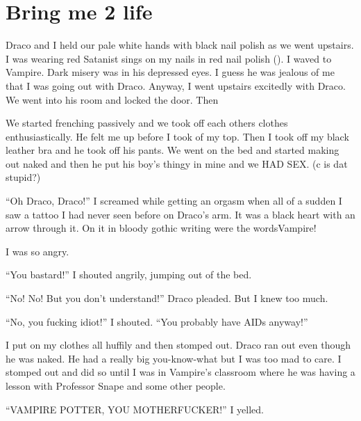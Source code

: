 \section{Bring me 2 life}



Draco and I held our pale white hands with black nail polish as we went upstairs. I was wearing red Satanist sings on my nails in red nail polish (). I waved to Vampire. Dark misery was in his depressed eyes. I guess he was jealous of me that I was going out with Draco. Anyway, I went upstairs excitedly with Draco. We went into his room and locked the door. Then\dotfill

\begin{sloppypar}
    We started frenching passively and we took off each others clothes enthusiastically. He felt me up before I took of my top. Then I took off my black leather bra and he took off his pants. We went on the bed and started making out naked and then he put his boy's thingy in mine and we HAD SEX\@. (c is dat stupid?)
\end{sloppypar}

\enquote{Oh Draco, Draco!} I screamed while getting an orgasm when all of a sudden I saw a tattoo I had never seen before on Draco's arm. It was a black heart with an arrow through it. On it in bloody gothic writing were the words\dotfill Vampire!

I was so angry.

\enquote{You bastard!} I shouted angrily, jumping out of the bed.

\enquote{No! No! But you don't understand!} Draco pleaded. But I knew too much.

\enquote{No, you fucking idiot!} I shouted. \enquote{You probably have AIDs anyway!}

I put on my clothes all huffily and then stomped out. Draco ran out even though he was naked. He had a really big you-know-what but I was too mad to care. I stomped out and did so until I was in Vampire's classroom where he was having a lesson with Professor Snape and some other people.

\enquote{VAMPIRE POTTER, YOU MOTHERFUCKER!} I yelled.
